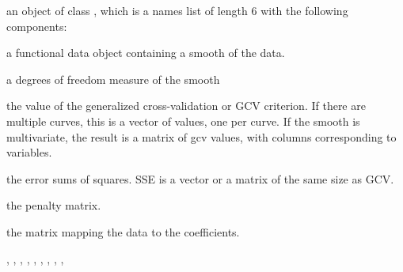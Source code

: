 \begin{Value}
an object of class , which is a names list of length 6
with the following components: 

\begin{ldescription}
\item[\code{fd}] a functional data object containing a smooth of the data. 

\item[\code{df}] a degrees of freedom measure of the smooth

\item[\code{gcv}] the value of the generalized cross-validation or GCV criterion.  If
there are multiple curves, this is a vector of values, one per
curve.  If the smooth is multivariate, the result is a matrix of gcv
values, with columns corresponding to variables.


\item[\code{SSE}] the error sums of squares.  SSE is a vector or a matrix of the same
size as GCV. 

\item[\code{penmat}] the penalty matrix.

\item[\code{y2cMap}] the matrix mapping the data to the coefficients.

\end{ldescription}
\end{Value}
\begin{SeeAlso}\relax
{}, , 
, , 
, , 
, , 
, 
\end{SeeAlso}
